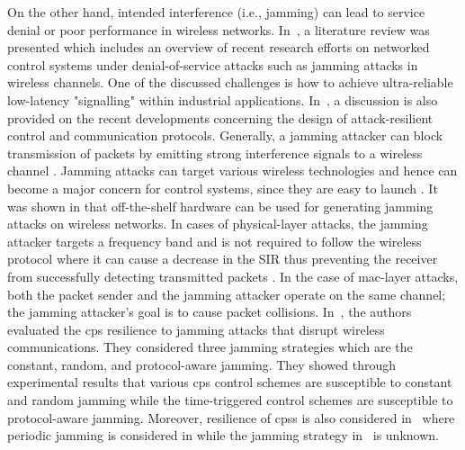 On the other hand, intended interference (i.e., jamming) can lead to service denial or poor performance in wireless networks. In~\cite{8631535}, a literature review was presented which includes an overview of recent research efforts on networked control systems under denial-of-service attacks such as jamming attacks in wireless channels. One of the discussed challenges is how to achieve ultra-reliable low-latency "signalling" within industrial applications. In~\cite{Cetinkaya_2019}, a discussion is also provided on the recent developments concerning the design of attack-resilient control and communication protocols. Generally, a jamming attacker can block transmission of packets by emitting strong interference signals to a wireless channel \cite{1637931,5473884}. Jamming attacks can target various wireless technologies and hence can become a major concern for control systems, since they are easy to launch \cite{5473884}. It was shown in \cite{10.1007/978-3-319-07788-8_40} that off-the-shelf hardware can be used for generating jamming attacks on wireless networks. In cases of physical-layer attacks, the jamming attacker targets a frequency band and is not required to follow the wireless protocol where it can cause a decrease in the SIR thus preventing the receiver from successfully detecting transmitted packets \cite{10.1007/978-3-319-07788-8_40}. In the case of \gls{mac}-layer attacks, both the packet sender and the jamming attacker operate on the same channel; the jamming attacker’s goal is to cause packet collisions.
In~\cite{8726803}, the authors evaluated the \gls{cps} resilience to jamming attacks that disrupt wireless communications. They considered three jamming strategies which are the constant, random, and protocol-aware jamming. They showed through experimental results that various \gls{cps} control schemes are susceptible to constant and random jamming while the time-triggered control schemes are susceptible to protocol-aware jamming. Moreover, resilience of \glspl{cps} is also considered in~\cite{6425868,DEPERSIS2014134,7402971,7575630} where periodic jamming is considered in \cite{6425868} while the jamming strategy in~\cite{DEPERSIS2014134,7402971,7575630} is unknown. 


